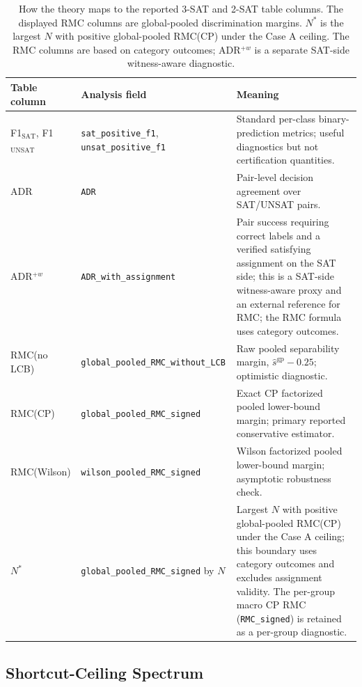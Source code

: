 \documentclass[conference]{IEEEtran}
\theoremstyle{remark}
\begin{document}
\begin{table}[t]
\centering
\caption{How the theory maps to the reported 3-SAT and 2-SAT table columns.
The displayed RMC columns are global-pooled discrimination margins.  $N^*$ is
the largest $N$ with positive global-pooled RMC(CP) under the Case A ceiling.  The RMC columns are based on category outcomes; ADR$^{+w}$ is a separate SAT-side witness-aware diagnostic.}
\label{tab:column_map}
\renewcommand{\arraystretch}{1.18}
\begin{tabular}{p{3.0cm}p{5.0cm}p{8.0cm}}
\toprule
Table column & Analysis field & Meaning \\
\midrule
F1$_{\mathrm{SAT}}$, F1$_{\mathrm{UNSAT}}$
& \texttt{sat\_positive\_f1}, \texttt{unsat\_positive\_f1}
& Standard per-class binary-prediction metrics; useful diagnostics but not certification quantities. \\
ADR
& \texttt{ADR}
& Pair-level decision agreement over SAT/UNSAT pairs. \\
ADR$^{+w}$
& \texttt{ADR\_with\_assignment}
& Pair success requiring correct labels and a verified satisfying assignment on the SAT side; this is a SAT-side witness-aware proxy and an external reference for RMC; the RMC formula uses category outcomes. \\
RMC(no LCB)
& \texttt{global\_pooled\_RMC\_without\_LCB}
& Raw pooled separability margin, $\hat{s}^{\mathrm{gp}}-0.25$; optimistic diagnostic. \\
RMC(CP)
& \texttt{global\_pooled\_RMC\_signed}
& Exact CP factorized pooled lower-bound margin; primary reported conservative estimator. \\
RMC(Wilson)
& \texttt{wilson\_pooled\_RMC\_signed}
& Wilson factorized pooled lower-bound margin; asymptotic robustness check. \\
$N^*$
& \texttt{global\_pooled\_RMC\_signed} by $N$
& Largest $N$ with positive global-pooled RMC(CP) under the Case A ceiling; this boundary uses category outcomes and excludes assignment validity.  The per-group macro CP RMC (\texttt{RMC\_signed}) is retained as a per-group diagnostic. \\
\bottomrule
\end{tabular}
\end{table}

\subsection{Shortcut-Ceiling Spectrum}
\label{sec:ceiling_spectrum}
\end{document}
